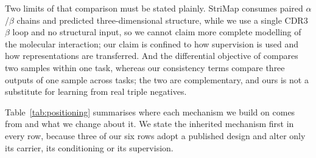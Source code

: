 \documentclass[webpdf,modern,large,namedate]{oup-authoring-template}
\theoremstyle{thmstyleone}
\theoremstyle{thmstyletwo}
\theoremstyle{thmstylethree}
\begin{document}
Two limits of that comparison must be stated plainly. StriMap consumes paired
$\alpha$/$\beta$ chains and predicted three-dimensional structure, while we use
a single CDR3$\beta$ loop and no structural input, so we cannot claim more
complete modelling of the molecular interaction; our claim is confined to how
supervision is used and how representations are transferred. And the
differential objective of \citet{niu2025attention} compares two samples within
one task, whereas our consistency terms compare three outputs of one sample
across tasks; the two are complementary, and ours is not a substitute for
learning from real triple negatives.

Table~\ref{tab:positioning} summarises where each mechanism we build on comes
from and what we change about it. We state the inherited mechanism first in
every row, because three of our six rows adopt a published design and alter
only its carrier, its conditioning or its supervision.
\end{document}
